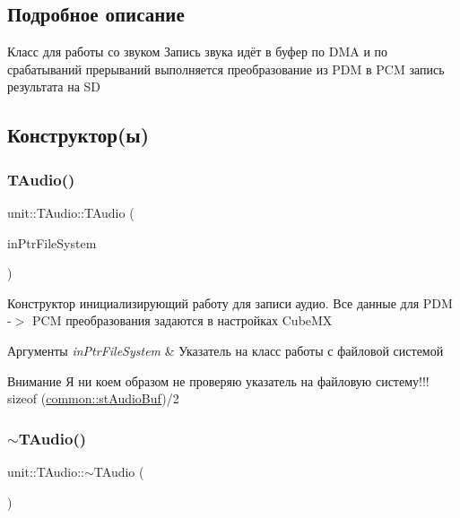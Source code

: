 \subsection{Подробное описание}


 Класс для работы со звуком Запись звука идёт в буфер по D\+MA и по срабатываний прерываний выполняется преобразование из P\+DM в P\+CM запись результата на SD 

\subsection{Конструктор(ы)}
\mbox{\label{classunit_1_1_t_audio_a326d9d807df56ef1a264564c69c350b5}} 
\subsubsection{\texorpdfstring{T\+Audio()}{TAudio()}}
{\footnotesize\ttfamily unit\+::\+T\+Audio\+::\+T\+Audio (\begin{DoxyParamCaption}\item[{std\+::shared\+\_\+ptr$<$ \hyperlink{classunit_1_1_t_file_system}{T\+File\+System} $>$}]{in\+Ptr\+File\+System }\end{DoxyParamCaption})}

Конструктор инициализирующий работу для записи аудио. Все данные для P\+DM -\/$>$ P\+CM преобразования задаются в настройках Cube\+MX 
\begin{DoxyParams}{Аргументы}
{\em in\+Ptr\+File\+System} & Указатель на класс работы с файловой системой \\
\hline
\end{DoxyParams}
\begin{DoxyAttention}{Внимание}
Я ни коем образом не проверяю указатель на файловую систему!!! sizeof (\hyperlink{namespacecommon_aeca12b629edac6586f4b0fbcf9617769}{common\+::st\+Audio\+Buf})/2 
\end{DoxyAttention}
\mbox{\label{classunit_1_1_t_audio_ab62b7453a3128fd1ab9d2473237ba331}} 
\subsubsection{\texorpdfstring{$\sim$\+T\+Audio()}{~TAudio()}}
{\footnotesize\ttfamily unit\+::\+T\+Audio\+::$\sim$\+T\+Audio (\begin{DoxyParamCaption}{ }\end{DoxyParamCaption})\hspace{0.3cm}{\ttfamily [virtual]}}


